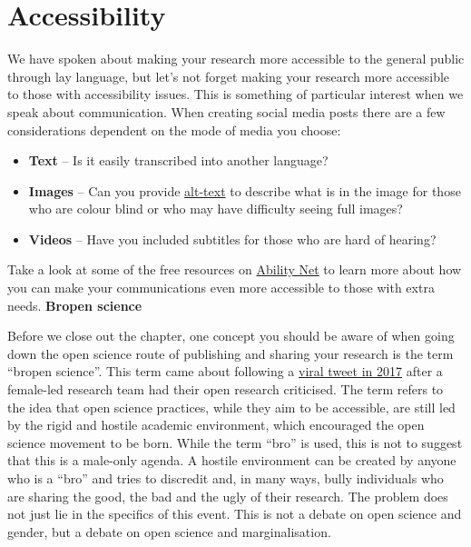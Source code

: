 \documentclass[
]{book}
\begin{document}
\hypertarget{accessibility}{%
\section{Accessibility}\label{accessibility}}

We have spoken about making your research more accessible to the general public through lay language, but let's not forget making your research more accessible to those with accessibility issues. This is something of particular interest when we speak about communication. When creating social media posts there are a few considerations dependent on the mode of media you choose:

\begin{itemize}
\item
  \textbf{Text} -- Is it easily transcribed into another language?
\item
  \textbf{Images} -- Can you provide \href{https://abilitynet.org.uk/news-blogs/five-golden-rules-compliant-alt-text}{alt-text} to describe what is in the image for those who are colour blind or who may have difficulty seeing full images?
\item
  \textbf{Videos} -- Have you included subtitles for those who are hard of hearing?
\end{itemize}

Take a look at some of the free resources on \href{https://abilitynet.org.uk/free-resources/abilitynet-factsheets}{Ability Net} to learn more about how you can make your communications even more accessible to those with extra needs. \textbf{Bropen science}

Before we close out the chapter, one concept you should be aware of when going down the open science route of publishing and sharing your research is the term ``bropen science''. This term came about following a \href{https://www.bps.org.uk/psychologist/bropenscience-broken-science}{viral tweet in 2017} after a female-led research team had their open research criticised. The term refers to the idea that open science practices, while they aim to be accessible, are still led by the rigid and hostile academic environment, which encouraged the open science movement to be born. While the term ``bro'' is used, this is not to suggest that this is a male-only agenda. A hostile environment can be created by anyone who is a ``bro'' and tries to discredit and, in many ways, bully individuals who are sharing the good, the bad and the ugly of their research. The problem does not just lie in the specifics of this event. This is not a debate on open science and gender, but a debate on open science and marginalisation.
\end{document}
